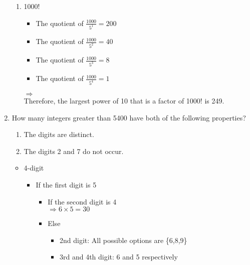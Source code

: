 \documentclass[12pt]{article}
\begin{document}
\begin{enumerate}
\begin{enumerate}[label=(\alph*)]
        
        \item 1000!\\
        \begin{itemize}
            \item The quotient of $\frac{1000}{5^1} = 200$
            \item The quotient of $\frac{1000}{5^2} = 40$
            \item The quotient of $\frac{1000}{5^3} = 8$
            \item The quotient of $\frac{1000}{5^4} = 1$
        \end{itemize}
        $\Rightarrow$ \\
        
        Therefore, the largest power of 10 that is a factor of 1000! is 249.
        
    \end{enumerate}
    
    \newpage
    \item How many integers greater than 5400 have both of the following properties?
    \begin{enumerate}[label=(\alph*)]
        \item The digits are distinct.
        \item The digits 2 and 7 do not occur.\\
    \end{enumerate}
    
    \begin{itemize}
        \item 4-digit
        \begin{itemize}
            \item If the first digit is 5
            \begin{itemize}
                \item If the second digit is 4\\
               \boldmath$\Rightarrow 6\times 5=30$
                \item Else
                \begin{itemize}
                    \item 2nd digit: All possible options are \{6,8,9\}
                    \item 3rd and 4th digit: 6 and 5 respectively\\
                \end{itemize}
            \\
            \end{itemize}
            

\end{itemize}
\end{itemize}
\end{enumerate}
\end{document}
